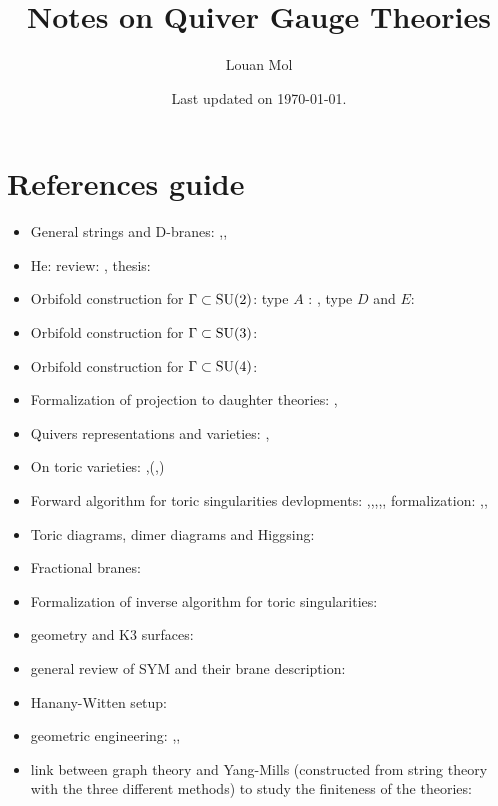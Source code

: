 \documentclass[a4paper,10pt]{article}
\title{\textbf{Notes on Quiver Gauge Theories}}
\author{Louan Mol}
\date{Last updated on \today.}
\begin{document}
%

\maketitle

\tableofcontents

\pagebreak

\nocite{*}



\appendix

\section{References guide}

\begin{itemize}
    \item General strings and D-branes: \cite{DbranespartI},\cite{DbranespartII},\cite{notesDbranes}
    \item He: review: \cite{he2004lectures}, thesis: \cite{masterHe}
    \item Orbifold construction for $\Gamma\subset\text{SU}(2)$: type $A$ : \cite{douglas1996dbranes}, type $D$ and $E$: \cite{PhysRevD.55.6382}
    \item Orbifold construction for $\Gamma\subset\text{SU}(3)$:\cite{Hanany_1999}
    \item Orbifold construction for $\Gamma\subset\text{SU}(4)$:\cite{Hanany:1999sp}
    \item Formalization of projection to daughter theories: \cite{vafa1998},\cite{silervstein1998}
    \item Quivers representations and varieties: \cite{brion},\cite{kirillov2016quiver}
    \item On toric varieties: \cite{cox2011toric},\cite{torigeomandCY}(\cite{fulton1993introduction},\cite{oda1988convex})
    \item Forward algorithm  for toric singularities devlopments: \cite{FA1},\cite{FA2},\cite{FA3},\cite{FA4},\cite{FA5}, formalization: \cite{FA6},\cite{FA7},\cite{FA8}
    \item Toric diagrams, dimer diagrams and Higgsing: \cite{Argurio_20081}
    \item Fractional branes: \cite{Argurio_20082}
    \item Formalization of inverse algorithm for toric singularities: \cite{Feng_2001}
    \item geometry and K3 surfaces: \cite{https://doi.org/10.48550/arxiv.hep-th/9611137}
    \item general review of SYM and their brane description: \cite{Elitzur_1997}
    \item Hanany-Witten setup: \cite{1997}
    \item geometric engineering: \cite{https://doi.org/10.48550/arxiv.hep-th/9706110},\cite{Katz:1996xe},\cite{Katz:1996fh}
    \item link between graph theory and Yang-Mills (constructed from string theory with the three different methods) to study the finiteness of the theories: \cite{Hanany:1999sp}
\end{itemize}
\end{document}
